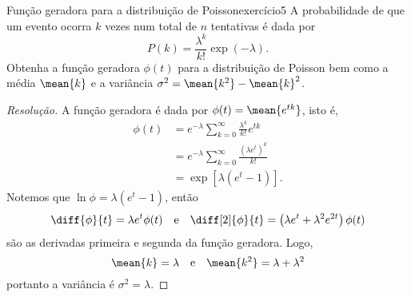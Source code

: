 \begin{exercício}{Função geradora para a distribuição de Poisson}{exercício5}
    A probabilidade de que um evento ocorra \(k\) vezes num total de \(n\) tentativas é dada por
    \begin{equation*}
        P(k) = \frac{\lambda^k}{k!}\exp(-\lambda).
    \end{equation*}
    Obtenha a função geradora \(\phi(t)\) para a distribuição de Poisson bem como a média \(\mean{k}\) e a variância \(\sigma^2 = \mean{k^2} - \mean{k}^2\).
\end{exercício}
\begin{proof}[Resolução]
    A função geradora é dada por \(\phi(t) = \mean{e^{tk}}\), isto é,
    \begin{align*}
        \phi(t) &= e^{-\lambda}\sum_{k = 0}^\infty \frac{\lambda^k}{k!}e^{tk}\\
                &= e^{-\lambda} \sum_{k = 0}^\infty \frac{(\lambda e^t)^k}{k!}\\
                &= \exp[\lambda (e^t - 1)].
    \end{align*}
    Notemos que \(\ln \phi = \lambda (e^t -1)\), então
    \begin{equation*}
        \diff{\phi}{t} = \lambda e^t \phi(t) \quad\text{e}\quad
        \diff[2]{\phi}{t} = \left(\lambda e^t  + \lambda^2 e^{2t}\right)\phi(t)
    \end{equation*}
    são as derivadas primeira e segunda da função geradora. Logo,
    \begin{equation*}
        \mean{k} = \lambda\quad\text{e}\quad
        \mean{k^2} = \lambda + \lambda^2
    \end{equation*}
    portanto a variância é \(\sigma^2 = \lambda.\)
\end{proof}
